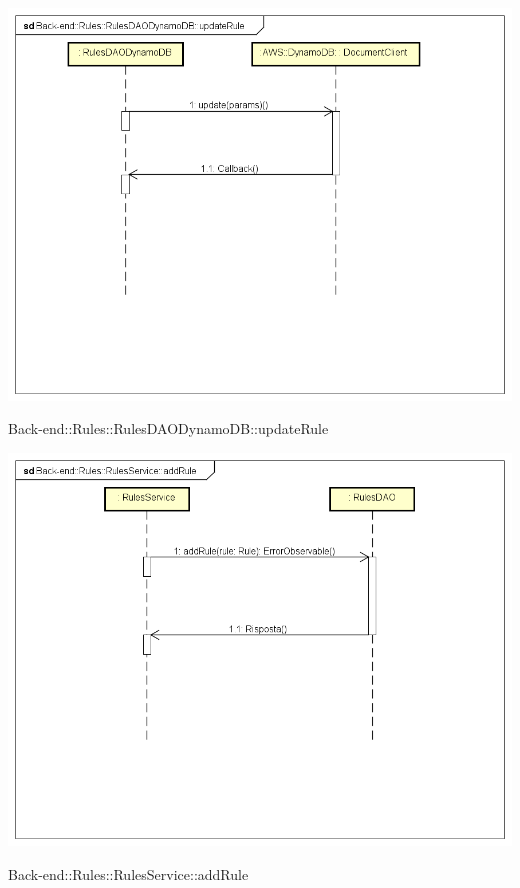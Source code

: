 \includegraphics[width=\textwidth,height=\textheight,keepaspectratio]{images/diagrams/back-end/Ufficial_Backend/Back-end__Rules__RulesDAODynamoDB__updateRule.png} 	\caption{Back-end::Rules::RulesDAODynamoDB::updateRule}
\includegraphics[width=\textwidth,height=\textheight,keepaspectratio]{images/diagrams/back-end/Ufficial_Backend/Back-end__Rules__RulesService__addRule.png} 	\caption{Back-end::Rules::RulesService::addRule}
